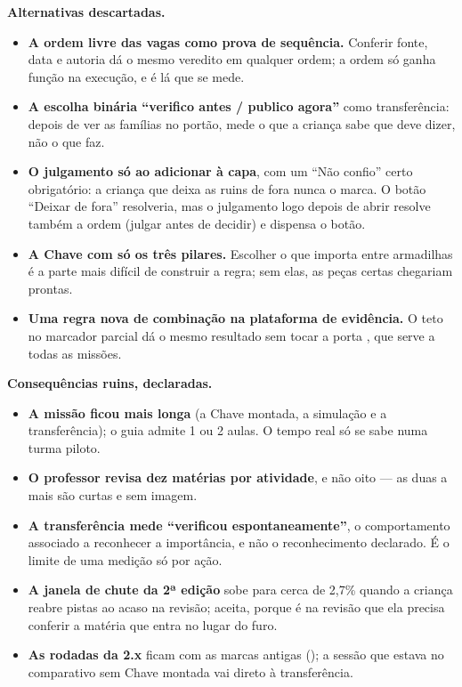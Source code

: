\textbf{Alternativas descartadas.}

\begin{itemize}
  \item \textbf{A ordem livre das vagas como prova de sequência.} Conferir fonte,
    data e autoria dá o mesmo veredito em qualquer ordem; a ordem só ganha
    função na execução, e é lá que se mede.
  \item \textbf{A escolha binária \enquote{verifico antes / publico agora}} como
    transferência: depois de ver as famílias no portão, mede o que a criança sabe
    que deve dizer, não o que faz.
  \item \textbf{O julgamento só ao adicionar à capa}, com um \enquote{Não confio} certo obrigatório: a
    criança que deixa as ruins de fora nunca o marca. O botão \enquote{Deixar de
    fora} resolveria, mas o julgamento logo depois de abrir resolve também a
    ordem (julgar antes de decidir) e dispensa o botão.
  \item \textbf{A Chave com só os três pilares.} Escolher o que importa entre
    armadilhas é a parte mais difícil de construir a regra; sem elas, as peças
    certas chegariam prontas.
  \item \textbf{Uma regra nova de combinação na plataforma de evidência.} O teto
    no marcador parcial dá o mesmo resultado sem tocar a porta , que
    serve a todas as missões.
\end{itemize}

\textbf{Consequências ruins, declaradas.}

\begin{itemize}
  \item \textbf{A missão ficou mais longa} (a Chave montada, a simulação e a
    transferência); o guia admite 1 ou 2 aulas. O tempo real só se sabe numa
    turma piloto.
  \item \textbf{O professor revisa dez matérias por atividade}, e não oito --- as
    duas a mais são curtas e sem imagem.
  \item \textbf{A transferência mede \enquote{verificou espontaneamente}}, o
    comportamento associado a reconhecer a importância, e não o reconhecimento
    declarado. É o limite de uma medição só por ação.
  \item \textbf{A janela de chute da 2ª edição} sobe para cerca de 2,7\% quando a
    criança reabre pistas ao acaso na revisão; aceita, porque é na revisão que ela
    precisa conferir a matéria que entra no lugar do furo.
  \item \textbf{As rodadas da 2.x} ficam com as marcas antigas (); a sessão que estava no comparativo sem Chave montada vai direto à
    transferência.
\end{itemize}

